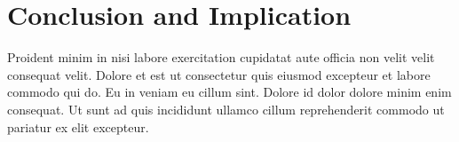 
\chapter{Conclusion and Implication}\label{ch:conclusionImplication}

Proident minim in nisi labore exercitation cupidatat aute officia non velit velit consequat velit. Dolore et est ut consectetur quis eiusmod excepteur et labore commodo qui do. Eu in veniam eu cillum sint. Dolore id dolor dolore minim enim consequat. Ut sunt ad quis incididunt ullamco cillum reprehenderit commodo ut pariatur ex elit excepteur.
